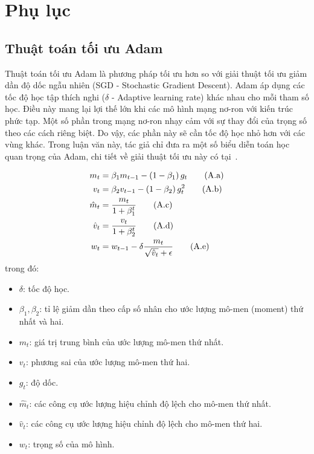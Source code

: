 \clearpage
{}

\chapter*{Phụ lục}

\renewcommand{\thesection}{\Alph{section}}

\section{Thuật toán tối ưu Adam}
\label{sec:adam}
Thuật toán tối ưu Adam là phương pháp tối ưu hơn so với giải thuật tối ưu giảm dần độ dốc ngẫu nhiên (SGD - Stochastic Gradient Descent). Adam áp dụng các tốc độ học tập thích nghi ($\delta$ - Adaptive learning rate) khác nhau cho mỗi tham số học. Điều này mang lại lợi thế lớn khi các mô hình mạng nơ-ron với kiến trúc phức tạp. Một số phần trong mạng nơ-ron nhạy cảm với sự thay đổi của trọng số theo các cách riêng biệt. Do vậy, các phần này sẽ cần tốc độ học nhỏ hơn với các vùng khác. Trong luận văn này, tác giả chỉ đưa ra một số biểu diễn toán học quan trọng của Adam, chi tiết về giải thuật tối ưu này có tại~\cite{Diederik2014}.

\begin{subequations}
    \begin{align}
        m_t &=\beta_1 m_{t-1}-\left(1-\beta_1\right) g_t  \tag{$\text{A.a}$}\\
        v_t &=\beta_2 v_{t-1}-\left(1-\beta_2\right) g_t^2 \tag{$\text{A.b}$}\\
        \hat{m}_t &=\frac{m_t}{1+\beta_1^t} \tag{$\text{A.c}$}\\
        \hat{v}_t &=\frac{v_t}{1+\beta_2^t} \tag{$\text{A.d}$}\\
        w_t &= w_{t-1}-\delta \frac{m_t}{\sqrt{\hat{v}_t}+\epsilon} \tag{$\text{A.e}$}
    \end{align}
\end{subequations}
trong đó:
\begin{itemize}[-]
    \item  $\delta$: tốc độ học.
    \item  $\beta_1, \beta_2$: tỉ lệ giảm dần theo cấp số nhân cho ước lượng mô-men (moment) thứ nhất và hai.
    \item  $m_t$: giá trị trung bình của ước lượng mô-men thứ nhất.
    \item  $v_t$: phương sai của ước lượng mô-men thứ hai.
    \item  $g_t$: độ dốc.
    \item  $\hat{m}_t$: các công cụ ước lượng hiệu chỉnh độ lệch cho mô-men thứ nhất.
    \item $\hat{v}_t$: các công cụ ước lượng hiệu chỉnh độ lệch cho mô-men thứ hai.
    \item $w_t$: trọng số của mô hình.
\end{itemize}